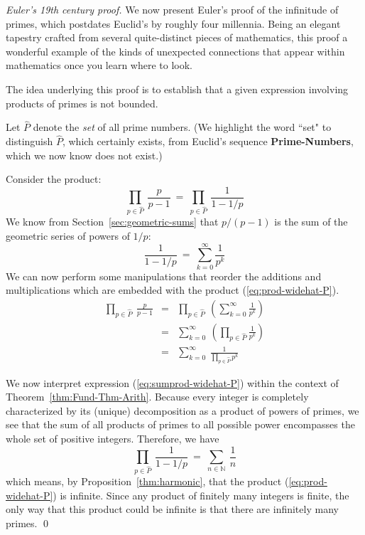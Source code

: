 \begin{proof} [Euler's 19th century proof]
We now present Euler's proof of the infinitude of primes, which postdates Euclid's by roughly four millennia.  Being an elegant tapestry crafted from several quite-distinct pieces of mathematics, this proof a wonderful example of the kinds of unexpected connections that appear within mathematics once you learn where to look.

\medskip

The idea underlying this proof is to establish that a given expression involving products of primes is not bounded.

\smallskip

Let $\widehat{P}$ denote the {\em set} of all prime numbers.  (We highlight the word ``set" to distinguish $\widehat{P}$, which certainly exists, from Euclid's sequence {\bf Prime-Numbers}, which we now know does not exist.)

\smallskip

Consider the product:
\begin{equation}
\label{eq:prod-widehat-P}
 \prod_{p \in \widehat{P}} \ \frac{p}{p-1} \ = \ \prod_{p \in \widehat{P}} \ \frac{1}{1-1/p} 
\end{equation}
We know from Section~\ref{sec:geometric-sums} that $p/(p-1)$ is the sum of the geometric series of powers of $1/p$: 
\[ \frac{1}{1-1/p} \ = \ 
\sum_{k=0}^{\infty} \frac{1}{p^k}
\]
We can now perform some manipulations that reorder the additions and multiplications which are embedded with the product (\ref{eq:prod-widehat-P}).
\begin{eqnarray}
\prod_{p \in \widehat{P}} \ \frac{p}{p-1}
\nonumber
         & = & \prod_{p \in \widehat{P}} \ \left( \sum_{k=0}^{\infty} \frac{1}{p^k} \right) \\
\nonumber
         & = & \sum_{k=0}^{\infty} \ \left( \prod_{p \in \widehat{P}} \frac{1}{p^k} \right) \\
\label{eq:sumprod-widehat-P}
         & = & \sum_{k=0}^{\infty} \ \frac{1}{\prod_{p \in \widehat{P}} p^k} 
\end{eqnarray}

\smallskip

We now interpret expression (\ref{eq:sumprod-widehat-P}) within the context of Theorem~\ref{thm:Fund-Thm-Arith}.  Because every integer is completely characterized by its (unique) decomposition as a product of powers of primes, we see that the sum of all products of primes to all possible power encompasses the whole set of positive integers.  Therefore, we have
\[ \prod_{p \in \widehat{P}} \ \frac{1}{1-1/p} \ = \ \sum_{n \in \mathbb{N}} \ \frac{1}{n} \]
which means, by Proposition~\ref{thm:harmonic}, that the product (\ref{eq:prod-widehat-P}) is infinite.  Since any product of finitely many integers is finite, the only way that this product could be infinite is that there are infinitely many primes.  \qed
\end{proof}

